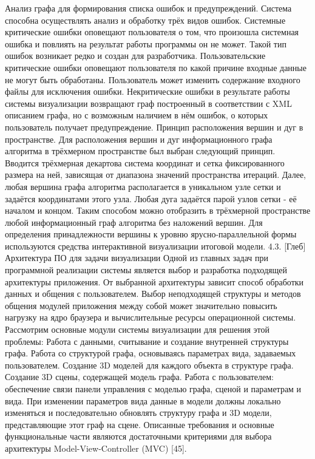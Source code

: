 Анализ графа для формирования списка ошибок и предупреждений.
Система способна осуществлять анализ и обработку трёх видов ошибок. Системные критические ошибки оповещают пользователя о том, что произошла системная ошибка и повлиять на результат работы программы он не может. Такой тип ошибок возникает редко и создан для разработчика. Пользовательские критические ошибки оповещают пользователя по какой причине входные данные не могут быть обработаны. Пользователь может изменить содержание входного файлы для исключения ошибки. Некритические ошибки в результате работы системы визуализации возвращают граф построенный в соответствии с XML описанием графа, но с возможным наличием в нём ошибок, о которых пользователь получает предупреждение.
Принцип расположения вершин и дуг в пространстве.
Для расположения вершин и дуг информационного графа алгоритма в трёхмерном пространстве был выбран следующий принцип. Вводится трёхмерная декартова система координат и сетка фиксированного размера на ней, зависящая от диапазона значений пространства итераций. Далее, любая вершина графа алгоритма располагается в уникальном узле сетки и задаётся координатами этого узла. Любая дуга задаётся парой узлов сетки - её началом и концом. Таким способом можно отобразить в трёхмерной пространстве любой информационный граф алгоритма без наложений вершин. Для определения принадлежности вершины к уровню ярусно-параллельной формы используются средства интерактивной визуализации итоговой модели.
4.3. [Глеб] Архитектура ПО для задачи визуализации
Одной из главных задач при программной реализации системы является выбор и разработка подходящей архитектуры приложения. От выбранной архитектуры зависит способ обработки данных и общения с пользователем. Выбор неподходящей структуры и методов общения модулей приложения между собой может значительно повысить нагрузку на ядро браузера и вычислительные ресурсы операционной системы. Рассмотрим основные модули системы визуализации для решения этой проблемы:
Работа с данными, считывание и создание внутренней структуры графа.
Работа со структурой графа, основываясь параметрах вида, задаваемых пользователем. Создание 3D моделей для каждого объекта в структуре графа.
Создание 3D сцены, содержащей модель графа.
Работа с пользователем: обеспечение связи панели управления с моделью графа, сценой и параметрам и вида.
При изменении параметров вида данные в модели должны локально изменяться и последовательно обновлять структуру графа и 3D модели, представляющие этот граф на сцене.
Описанные требования и основные функциональные части являются достаточными критериями для выбора архитектуры Model-View-Controller (MVC) [45].

